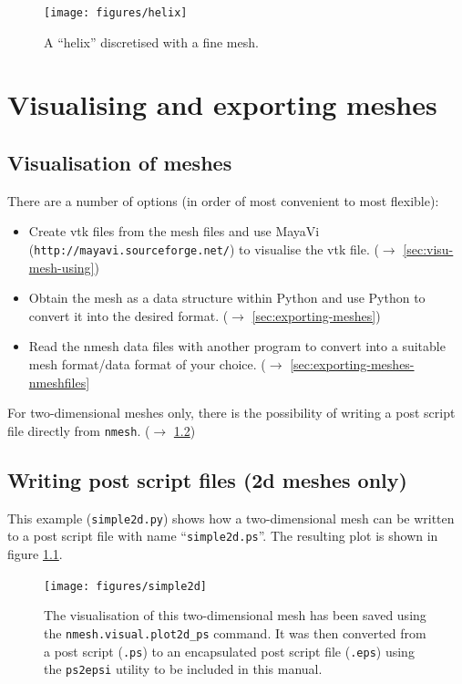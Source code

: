 \documentclass[10pt,a4paper]{book}
\newcommand{\nmesh}{\texttt{nmesh}}
\begin{document}
\begin{figure}[tbhp]
\centerline{\texttt{[image: figures/helix]}}
\caption{\label{fig:helix} A ``helix'' discretised with a fine mesh.}
\end{figure}



\chapter{Visualising and exporting meshes}

\section{Visualisation of meshes}
There are a number of options (in order of most convenient to most flexible):
\begin{itemize}
\item Create vtk files from the mesh files and use MayaVi (\texttt{http://mayavi.sourceforge.net/}) to visualise the vtk file. ($\rightarrow$ \ref{sec:visu-mesh-using})
\item Obtain the mesh as a data structure within Python and use Python to convert it into the desired format. ($\rightarrow$ \ref{sec:exporting-meshes})
\item Read the nmesh data files with another program to convert into a suitable mesh format/data format of your choice. ($\rightarrow$ \ref{sec:exporting-meshes-nmeshfiles}
\end{itemize}

For two-dimensional meshes only, there is the possibility of writing a post script file directly from \nmesh. ($\rightarrow$ \ref{sec:2dpostscriptplotting})


\section{Writing post script files (2d meshes only)}
\label{sec:2dpostscriptplotting}

This example (\texttt{simple2d.py}) shows how a two-dimensional mesh can be written to a post script file with name ``\texttt{simple2d.ps}''. The resulting plot is shown in figure \ref{fig:simple2d_forplotting}.




\begin{figure}[tbhp]
\centerline{\texttt{[image: figures/simple2d]}}
\caption{\label{fig:simple2d_forplotting} The visualisation of this two-dimensional mesh has been saved using the \texttt{nmesh.visual.plot2d\_ps} command. It was then converted from a post script (\texttt{.ps}) to an encapsulated post script file (\texttt{.eps}) using the \texttt{ps2epsi} utility to be included in this manual.}
\end{figure}
\end{document}
